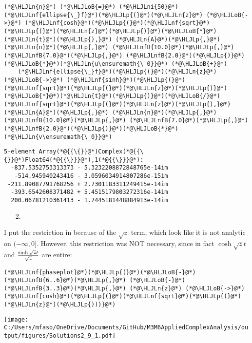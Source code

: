 \documentclass[12pt,a4paper]{article}
\newcommand{\HLJLn}[1]{#1}
\newcommand{\HLJLnf}[1]{\textcolor[RGB]{66,102,213}{#1}}
\newcommand{\HLJLnfB}[1]{\textcolor[RGB]{59,151,46}{#1}}
\newcommand{\HLJLni}[1]{\textcolor[RGB]{59,151,46}{#1}}
\newcommand{\HLJLoB}[1]{\textcolor[RGB]{102,102,102}{\textbf{#1}}}
\newcommand{\HLJLp}[1]{#1}
\begin{document}
\begin{lstlisting}
(*@\HLJLn{n}@*) (*@\HLJLoB{=}@*) (*@\HLJLni{50}@*)
(*@\HLJLnf{ellipse{\_}f}@*)(*@\HLJLp{(}@*)(*@\HLJLn{z}@*) (*@\HLJLoB{->}@*) (*@\HLJLnf{cosh}@*)(*@\HLJLp{(}@*)(*@\HLJLnf{sqrt}@*)(*@\HLJLp{(}@*)(*@\HLJLn{z}@*)(*@\HLJLp{)}@*)(*@\HLJLoB{*}@*)(*@\HLJLn{t}@*)(*@\HLJLp{),}@*) (*@\HLJLn{A}@*)(*@\HLJLp{,}@*) (*@\HLJLn{n}@*)(*@\HLJLp{,}@*) (*@\HLJLnfB{10.0}@*)(*@\HLJLp{,}@*) (*@\HLJLnfB{7.0}@*)(*@\HLJLp{,}@*) (*@\HLJLnfB{2.0}@*)(*@\HLJLp{)}@*)(*@\HLJLoB{*}@*)(*@\HLJLn{u\ensuremath{\_0}}@*) (*@\HLJLoB{+}@*)
    (*@\HLJLnf{ellipse{\_}f}@*)(*@\HLJLp{(}@*)(*@\HLJLn{z}@*) (*@\HLJLoB{->}@*) (*@\HLJLnf{sinh}@*)(*@\HLJLp{(}@*)(*@\HLJLnf{sqrt}@*)(*@\HLJLp{(}@*)(*@\HLJLn{z}@*)(*@\HLJLp{)}@*)(*@\HLJLoB{*}@*)(*@\HLJLn{t}@*)(*@\HLJLp{)}@*)(*@\HLJLoB{/}@*)(*@\HLJLnf{sqrt}@*)(*@\HLJLp{(}@*)(*@\HLJLn{z}@*)(*@\HLJLp{),}@*) (*@\HLJLn{A}@*)(*@\HLJLp{,}@*) (*@\HLJLn{n}@*)(*@\HLJLp{,}@*) (*@\HLJLnfB{10.0}@*)(*@\HLJLp{,}@*) (*@\HLJLnfB{7.0}@*)(*@\HLJLp{,}@*) (*@\HLJLnfB{2.0}@*)(*@\HLJLp{)}@*)(*@\HLJLoB{*}@*)(*@\HLJLn{v\ensuremath{\_0}}@*)
\end{lstlisting}

\begin{lstlisting}
5-element Array(*@{{\{}}@*)Complex(*@{{\{}}@*)Float64(*@{{\}}}@*),1(*@{{\}}}@*):
  -837.5352753313373 - 5.3232208872848765e-14im
   -514.945940243416 - 3.0596034914807286e-15im
 -211.89087791768256 + 2.7301183311249415e-14im
  -393.6542608371482 + 5.4515179803272316e-14im
  200.06781210361413 - 1.7445181448884913e-14im
\end{lstlisting}


\begin{itemize}
\item[2. ] \end{itemize}
I put the restriction in because of the $\sqrt z$ term, which look like it is not analytic on $(-\infty,0]$. However, this restriction was NOT necessary, since in fact $\cosh \sqrt z t$ and ${\sinh \sqrt z t \over \sqrt z}$ are entire:


\begin{lstlisting}
(*@\HLJLnf{phaseplot}@*)(*@\HLJLp{(}@*)(*@\HLJLoB{-}@*)(*@\HLJLnfB{6..6}@*)(*@\HLJLp{,}@*) (*@\HLJLoB{-}@*)(*@\HLJLnfB{3..3}@*)(*@\HLJLp{,}@*) (*@\HLJLn{z}@*) (*@\HLJLoB{->}@*) (*@\HLJLnf{cosh}@*)(*@\HLJLp{(}@*)(*@\HLJLnf{sqrt}@*)(*@\HLJLp{(}@*)(*@\HLJLn{z}@*)(*@\HLJLp{)))}@*)
\end{lstlisting}

\texttt{[image: C:/Users/mfaso/OneDrive/Documents/GitHub/M3M6AppliedComplexAnalysis/output/figures/Solutions2\_9\_1.pdf]}
\end{document}
